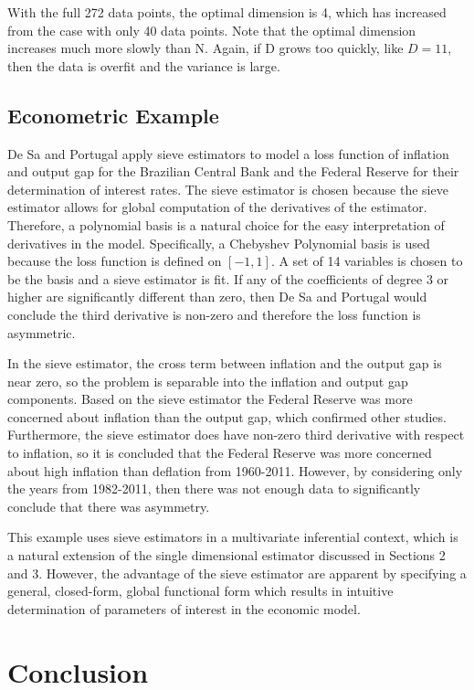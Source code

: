 \documentclass[12pt]{article}  %
\begin{document}
With the full 272 data points, the optimal dimension is 4, which has increased from the case with only 40 data points. Note that the optimal dimension increases much more slowly than N. Again, if D grows too quickly,  like $D = 11$, then the data is overfit and the variance is large. 


\subsection{Econometric Example}

De Sa and Portugal apply sieve estimators to model a loss function of inflation and output gap for the Brazilian Central Bank and the Federal Reserve for their determination of interest rates.  The sieve estimator is chosen because the sieve estimator allows for global computation of the derivatives of the estimator. Therefore, a polynomial basis is a natural choice for the easy interpretation of derivatives in the model. Specifically, a Chebyshev Polynomial basis is used because the loss function is defined on $[-1,1]$.  A set of 14 variables is chosen to be the basis and a sieve estimator is fit. If any of the coefficients of degree 3 or higher are significantly different than zero, then De Sa and Portugal would conclude the third derivative is non-zero and therefore the loss function is asymmetric. 

In the sieve estimator, the cross term between inflation and the output gap is near zero, so the problem is separable into the inflation and output gap components. Based on the sieve estimator the Federal Reserve was more concerned about inflation than the output gap, which confirmed other studies. Furthermore, the sieve estimator does have non-zero third derivative with respect to inflation, so it is concluded that the Federal Reserve was more concerned about high inflation than deflation from 1960-2011. However, by considering only the years from 1982-2011, then there was not enough data to significantly conclude that there was asymmetry.  

This example uses sieve estimators in a multivariate inferential context, which is a natural extension of the single dimensional estimator discussed in Sections 2 and 3. However, the advantage of the sieve estimator are apparent by specifying a general, closed-form, global functional form which results in intuitive determination of parameters of interest in the economic model. 

\section{Conclusion}
\end{document}

